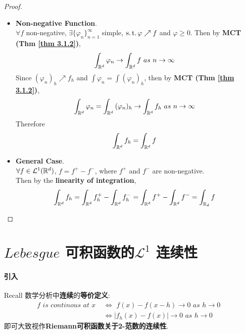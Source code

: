 \begin{thm}
\begin{proof}
\begin{itemize}
				\vspace{2em}
				\item \textbf{Non-negative Function}. \\
				$\forall f$ non-negative, $\exists \{ \varphi_n \}_{n = 1}^{\infty}$ simple, $\operatorname{s.t.} \varphi \nearrow f$ and $\varphi \geq 0$. Then by \textbf{MCT (Thm \ref{thm 3.1.2})},
				\begin{align}
					\int_{\mathbb{R}^d}{\varphi_n} \to \int_{\mathbb{R}^d}{f} \,\, as \,\, n \to \infty
				\end{align}
				Since $(\varphi_n)_h \nearrow f_h$ and $\int{\varphi_n} = \int{(\varphi_n)_h}$, then by \textbf{MCT (Thm \ref{thm 3.1.2})},
				\begin{align}
					\int_{\mathbb{R}^d}{\varphi_n} = \int_{\mathbb{R}^d}{(\varphi_n)_h} \to \int_{\mathbb{R}^d}{f_h} \,\, as \,\, n \to \infty
				\end{align}
				Therefore
				\begin{align}
					\int_{\mathbb{R}^d}{f_h} = \int_{\mathbb{R}^d}{f}
				\end{align}
			
				\vspace{2em}
				\item \textbf{General Case}. \\
				$\forall f \in \mathcal{L}^{1}(\mathbb{R}^d)$, $f = f^{+} - f^{-}$, where $f^{+}$ and $f^{-}$ are non-negative. \\
				Then by the \textbf{linearity of integration},
				\begin{align}
					\int_{\mathbb{R}^d}{f_h} = \int_{\mathbb{R}^d}{f^{+}_h} - \int_{\mathbb{R}^d}{f^{-}_h} = \int_{\mathbb{R}^d}{f^{+}} - \int_{\mathbb{R}^d}{f^{-}} = \int_{\mathbb{R}_d}{f}
				\end{align}
			\end{itemize}
		\end{proof}
	\end{thm}

\newpage
\section{$Lebesgue$ 可积函数的$\mathcal{L}^1$ 连续性}
\paragraph{引入}
	Recall 数学分析中\textbf{连续}的\textbf{等价定义}:
	\begin{align}
		f \,\, is \,\, continous \,\, at \,\, x \,\, &\Leftrightarrow \,\, f(x) - f(x - h) \to 0 \,\, as \,\, h \to 0 \\
		&\Leftrightarrow \left| f_{h}(x) - f(x) \right| \to 0 \,\, as \,\, h \to 0
	\end{align}
	即可大致视作\textbf{Riemann可积函数关于2-范数的连续性}.

